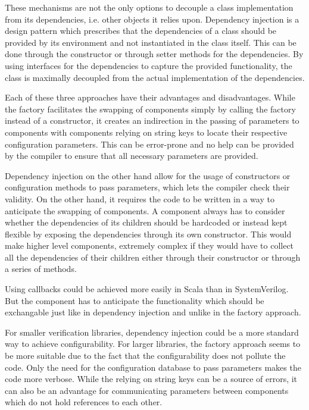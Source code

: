 These mechanisms are not the only options to decouple a class implementation from its dependencies, i.e. other
objects it relies upon. Dependency injection is a design pattern which prescribes that the dependencies of a class
should be provided by its environment and not instantiated in the class itself. This can be done through the
constructor or through setter methods for the dependencies. By using interfaces for the dependencies to capture the
provided functionality, the class is maximally decoupled from the actual implementation of the dependencies.


Each of these three approaches have their advantages and disadvantages. While the factory facilitates the swapping of
components simply by calling the factory instead of a constructor, it creates an indirection in the passing of
parameters to components with components relying on string keys to locate their respective configuration parameters.
This can be error-prone and no help can be provided by the compiler to ensure that all necessary parameters are provided.

Dependency injection on the other hand allow for the usage of constructors or configuration methods to pass
parameters, which lets the compiler check their validity. On the other hand, it requires the code to be written in a
way to anticipate the swapping of components. A component always has to consider whether the dependencies of its
children should be hardcoded or instead kept flexible by exposing the dependencies through its own constructor. This
would make higher level components, extremely complex if they would have to collect all the dependencies of their
children either through their constructor or through a series of methods.

Using callbacks could be achieved more easily in Scala than in SystemVerilog. But the component has to anticipate the
functionality which should be exchangable just like in dependency injection and unlike in the factory approach.

For smaller verification libraries, dependency injection could be a more standard way to achieve configurability. For
larger libraries, the factory approach seems to be more suitable due to the fact that the configurability does not
pollute the code. Only the need for the configuration database to pass parameters makes the code more verbose. While
the relying on string keys can be a source of errors, it can also be an advantage for communicating parameters
between components which do not hold references to each other.

